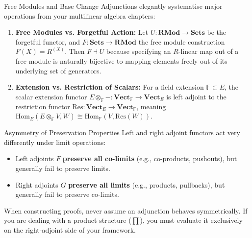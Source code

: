 \documentclass[10pt,a4paper]{article}
\theoremstyle{definition}
\newcommand{\F}{\mathbb{F}}
\begin{document}
	\begin{examplebox}{Free Modules and Base Change}
		Adjunctions elegantly systematise major operations from your multilinear algebra chapters:
		\begin{enumerate}
			\item \textbf{Free Modules vs. Forgetful Action:} Let $U: \mathbf{RMod} \to \mathbf{Sets}$ be the forgetful functor, and $F: \mathbf{Sets} \to \mathbf{RMod}$ the free module construction $F(X) = R^{(X)}$. Then $F \dashv U$ because specifying an $R$-linear map out of a free module is naturally bijective to mapping elements freely out of its underlying set of generators.
			\item \textbf{Extension vs. Restriction of Scalars:} For a field extension $\F \subset E$, the scalar extension functor $E \otimes_{\F} - : \mathbf{Vect}_{\F} \to \mathbf{Vect}_{E}$ is left adjoint to the restriction functor $\text{Res}: \mathbf{Vect}_{E} \to \mathbf{Vect}_{\F}$, meaning $\text{Hom}_{E}(E \otimes_{\F} V, W) \cong \text{Hom}_{\F}(V, \text{Res}(W))$.
		\end{enumerate}
	\end{examplebox}
	
	\begin{warningbox}{Asymmetry of Preservation Properties}
		Left and right adjoint functors act very differently under limit operations:
		\begin{itemize}
			\item Left adjoints $F$ \textbf{preserve all co-limits} (e.g., co-products, pushouts), but generally fail to preserve limits.
			\item Right adjoints $G$ \textbf{preserve all limits} (e.g., products, pullbacks), but generally fail to preserve co-limits.
		\end{itemize}
		When constructing proofs, never assume an adjunction behaves symmetrically. If you are dealing with a product structure ($\prod$), you must evaluate it exclusively on the right-adjoint side of your framework.
	\end{warningbox}
	
	
	
\end{document}
